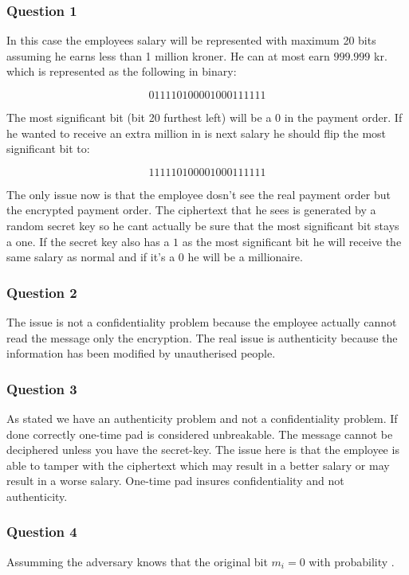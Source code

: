 \documentclass[
  paper=a4,
  ,captions=tableheading
]{scrartcl}
\begin{document}
\hypertarget{question-1}{%
\subsubsection{Question 1}\label{question-1}}

In this case the employees salary will be represented with maximum 20
bits assuming he earns less than 1 million kroner. He can at most earn
\(999.999\) kr. which is represented as the following in binary:

\[
011110100001000111111
\]

The most significant bit (bit 20 furthest left) will be a \(0\) in the
payment order. If he wanted to receive an extra million in is next
salary he should flip the most significant bit to:

\[
111110100001000111111
\]

The only issue now is that the employee dosn't see the real payment
order but the encrypted payment order. The ciphertext that he sees is
generated by a random secret key so he cant actually be sure that the
most significant bit stays a one. If the secret key also has a \(1\) as
the most significant bit he will receive the same salary as normal and
if it's a \(0\) he will be a millionaire.

\hypertarget{question-2}{%
\subsubsection{Question 2}\label{question-2}}

The issue is not a confidentiality problem because the employee actually
cannot read the message only the encryption. The real issue is
authenticity because the information has been modified by unautherised
people.

\hypertarget{question-3}{%
\subsubsection{Question 3}\label{question-3}}

As stated we have an authenticity problem and not a confidentiality
problem. If done correctly one-time pad is considered unbreakable. The
message cannot be deciphered unless you have the secret-key. The issue
here is that the employee is able to tamper with the ciphertext which
may result in a better salary or may result in a worse salary. One-time
pad insures confidentiality and not authenticity.

\hypertarget{question-4}{%
\subsubsection{Question 4}\label{question-4}}

Assumming the adversary knows that the original bit \(m_i=0\) with
probability .
\end{document}
